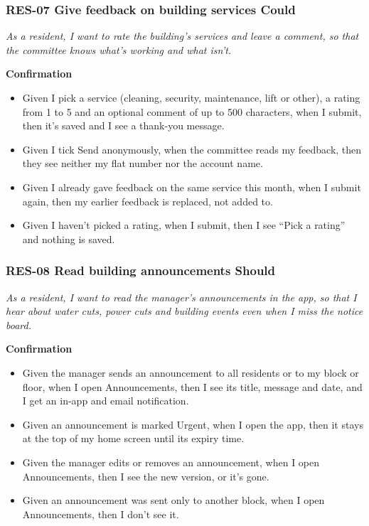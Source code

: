 \documentclass[11pt,a4paper]{report}
\begin{document}
\subsubsection*{RES-07 \textperiodcentered{} Give feedback on building services \textperiodcentered{} Could}

\emph{As a resident, I want to rate the building's services and leave a comment, so that the committee knows what's working and what isn't.}

\medskip\noindent\textbf{Confirmation}\par

\begin{itemize}
  \item Given I pick a service (cleaning, security, maintenance, lift or other), a rating from 1 to 5 and an optional comment of up to 500 characters, when I submit, then it's saved and I see a thank-you message.
  \item Given I tick Send anonymously, when the committee reads my feedback, then they see neither my flat number nor the account name.
  \item Given I already gave feedback on the same service this month, when I submit again, then my earlier feedback is replaced, not added to.
  \item Given I haven't picked a rating, when I submit, then I see ``Pick a rating'' and nothing is saved.
\end{itemize}

\subsubsection*{RES-08 \textperiodcentered{} Read building announcements \textperiodcentered{} Should}

\emph{As a resident, I want to read the manager's announcements in the app, so that I hear about water cuts, power cuts and building events even when I miss the notice board.}

\medskip\noindent\textbf{Confirmation}\par

\begin{itemize}
  \item Given the manager sends an announcement to all residents or to my block or floor, when I open Announcements, then I see its title, message and date, and I get an in-app and email notification.
  \item Given an announcement is marked Urgent, when I open the app, then it stays at the top of my home screen until its expiry time.
  \item Given the manager edits or removes an announcement, when I open Announcements, then I see the new version, or it's gone.
  \item Given an announcement was sent only to another block, when I open Announcements, then I don't see it.
\end{itemize}
\end{document}
